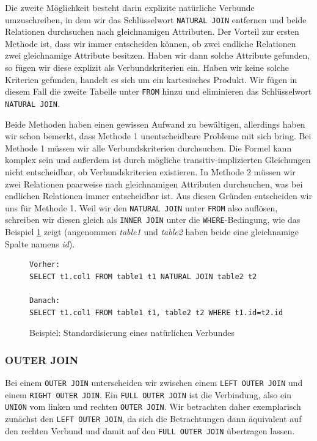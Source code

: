 Die zweite Möglichkeit besteht darin explizite natürliche Verbunde umzuschreiben, in dem wir das Schlüsselwort \verb|NATURAL JOIN| entfernen und beide Relationen durchsuchen nach gleichnamigen Attributen. Der Vorteil zur ersten Methode ist, dass wir immer entscheiden können, ob zwei endliche Relationen zwei gleichnamige Attribute besitzen. Haben wir dann solche Attribute gefunden, so fügen wir diese explizit als Verbundskriterien ein. Haben wir keine solche Kriterien gefunden, handelt es sich um ein kartesisches Produkt. Wir fügen in diesem Fall die zweite Tabelle unter \verb|FROM| hinzu und eliminieren das Schlüsselwort \verb|NATURAL JOIN|.

Beide Methoden haben einen gewissen Aufwand zu bewältigen, allerdings haben wir schon bemerkt, dass Methode 1 unentscheidbare Probleme mit sich bring. Bei Methode 1 müssen wir alle Verbundskriterien durchsuchen. Die Formel kann komplex sein und außerdem ist durch mögliche transitiv-implizierten Gleichungen nicht entscheidbar, ob Verbundskriterien existieren. In Methode 2 müssen wir zwei Relationen paarweise nach gleichnamigen Attributen durchsuchen, was bei endlichen Relationen immer entscheidbar ist.
Aus diesen Gründen entscheiden wir uns für Methode 1. Weil wir den \verb|NATURAL JOIN| unter \verb|FROM| also auflösen, schreiben wir diesen gleich als \verb|INNER JOIN| unter die \verb|WHERE|-Bedingung, wie das  Beispiel \ref{bsp:natjoin} zeigt (angenommen \textit{table1} und \textit{table2} haben beide eine gleichnamige Spalte namens \textit{id}).

\begin{figure}
\begin{verbatim}
Vorher:
SELECT t1.col1 FROM table1 t1 NATURAL JOIN table2 t2

Danach:
SELECT t1.col1 FROM table1 t1, table2 t2 WHERE t1.id=t2.id
\end{verbatim}
\caption{Beispiel: Standardisierung eines natürlichen Verbundes}
\label{bsp:natjoin}
\end{figure}

\subsubsection*{OUTER JOIN}

Bei einem \verb|OUTER JOIN| unterscheiden wir zwischen einem \verb|LEFT OUTER JOIN| und einem \verb|RIGHT OUTER JOIN|. Ein \verb|FULL OUTER JOIN| ist die Verbindung, also ein \verb|UNION| vom linken und rechten \verb|OUTER JOIN|. Wir betrachten daher exemplarisch zunächst den \verb|LEFT OUTER JOIN|, da sich die Betrachtungen dann äquivalent auf den rechten Verbund und damit auf den \verb|FULL OUTER JOIN| übertragen lassen.

